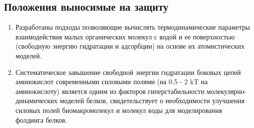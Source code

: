 \subsection{Положения выносимые на защиту}
\begin{enumerate}
  \item Разработаны подходы позволяющие вычислять термодинамические параметры взаимодействия малых органических молекул с водой и ее поверхностью (свободную энергию гидратации и адсорбции) на основе их атомистических моделей.
  \item Систематическое завышение свободной энергии гидратации боковых цепей аминокислот современными силовыми полями (на 0.5 - 2 kT на аминокислоту) является одним из факторов гиперстабильности молекулярно-динамических моделей белков, свидетельствует о необходимости улучшения силовых полей биомакромолекул и молекул воды для моделирования фолдинга белков. 
\end{enumerate}
